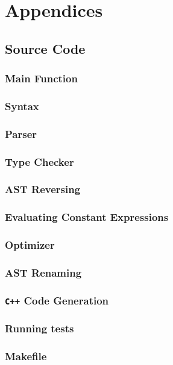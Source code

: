\section{Appendices} \label{sec:appendices}
\subsection{Source Code}
\subsubsection{Main Function}


\subsubsection{Syntax}


\subsubsection{Parser}


\subsubsection{Type Checker}


\subsubsection{AST Reversing}


\subsubsection{Evaluating Constant Expressions}


\subsubsection{Optimizer}


\subsubsection{AST Renaming}


\subsubsection{\texttt{C++} Code Generation}


\subsubsection{Running tests}


\subsubsection{Makefile}
